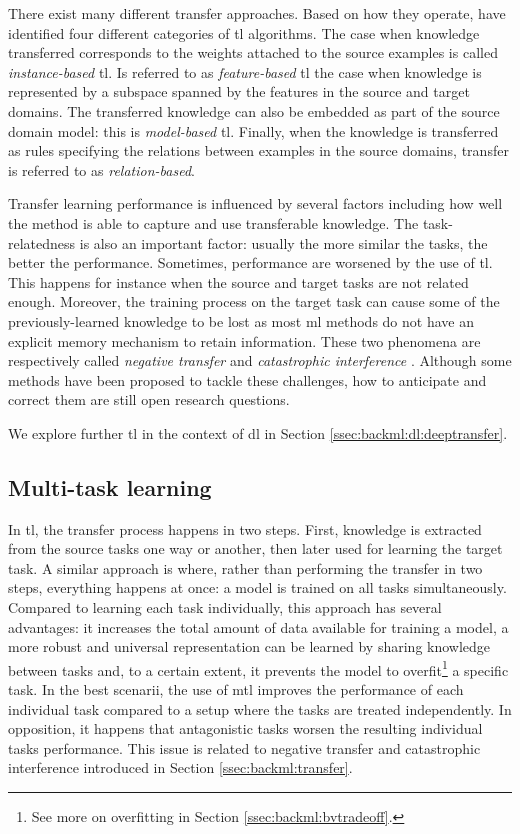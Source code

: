 There exist many different transfer approaches. Based on how they operate,
\cite{yang2020transfer} have identified four different categories of \acrlong{tl}
algorithms. The case when knowledge transferred corresponds to the weights attached
to the source examples is called \textit{instance-based} \acrlong{tl}. Is referred
to as \textit{feature-based} \acrlong{tl} the case when knowledge is represented
by a subspace spanned by the features in the source and target domains. The
transferred knowledge can also be embedded as part of the source domain model:
this is \textit{model-based} \acrlong{tl}. Finally, when the knowledge is transferred
as rules specifying the relations between examples in the source domains, transfer
is referred to as \textit{relation-based}.

Transfer learning performance is influenced by several factors including how well
the method is able to capture and use transferable knowledge. The task-relatedness
is also an important factor: usually the more similar the tasks, the better the
performance. Sometimes, performance are worsened by the use of \acrlong{tl}. This
happens for instance when the source and target tasks are not related enough.
Moreover, the training process on the target task can cause some of the
previously-learned knowledge to be lost as most \acrlong{ml} methods do not have
an explicit memory mechanism to retain information. These two phenomena are
respectively called \textit{negative transfer} \cite{zhang2020overcoming}
and \textit{catastrophic interference} \cite{french1999catastrophic}. Although
some methods have been proposed to tackle these challenges, how to anticipate and
correct them are still open research questions.

We explore further \acrlong{tl} in the context of \acrlong{dl} in Section
\ref{ssec:backml:dl:deeptransfer}.

\subsection{Multi-task learning}
\label{ssec:backml:mtl}

In \acrlong{tl}, the transfer process happens in two steps. First, knowledge is
extracted from the source tasks one way or another, then later used for learning
the target task. A similar approach is  where, rather than performing
the transfer in two steps, everything happens at once: a model is trained on all
tasks simultaneously. Compared to learning each task individually, this approach
has several advantages: it increases the total amount of data available for training
a model, a more robust and universal representation can be learned by sharing
knowledge between tasks and, to a certain extent, it prevents the model to
overfit\footnote{See more on overfitting in Section \ref{ssec:backml:bvtradeoff}.}
a specific task. In the best scenarii, the use of \acrlong{mtl} improves the
performance of each individual task compared to a setup where the tasks are treated
independently. In opposition, it happens that antagonistic tasks worsen the
resulting individual tasks performance. This issue is related to negative transfer
and catastrophic interference introduced in Section \ref{ssec:backml:transfer}.


